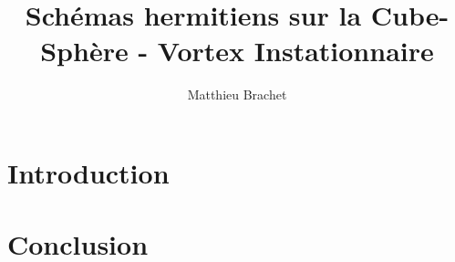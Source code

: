 \documentclass[10pt,a4paper]{article}
\title{Schémas hermitiens sur la Cube-Sphère - Vortex Instationnaire}
\author{Matthieu Brachet}
\begin{document}
\maketitle

\tableofcontents

\section*{Introduction}












\section*{Conclusion}
\end{document}
